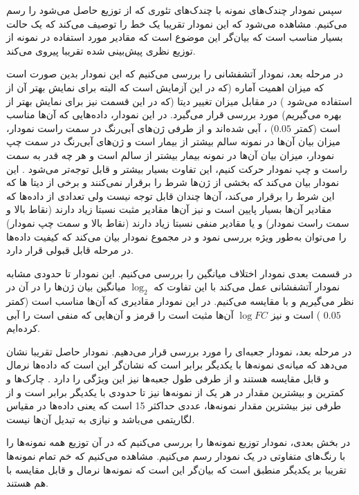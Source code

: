 \documentclass{article}
\begin{document}
سپس نمودار چندک‌های نمونه با چندک‌های تئوری که از توزیع
حاصل می‌شود را رسم می‌کنیم. مشاهده می‌شود که این نمودار تقریبا یک خط را توصیف می‌کند که یک حالت بسیار مناسب است که بیان‌گر این موضوع است که مقادیر مورد استفاده در نمونه از توزیع نظری پیش‌بینی شده تقریبا پیروی می‌کند.


در مرحله بعد، نمودار آتشفشانی
را بررسی می‌کنیم که این نمودار بدین صورت است که میزان اهمیت آماره (که در این آزمایش 
است که البته برای نمایش بهتر آن از 
استفاده می‌شود
)
در مقابل میزان تغییر دیتا (که در این قسمت نیز برای نمایش بهتر 
از 
بهره می‌گیریم)
مورد بررسی قرار می‌گیرد. در این نمودار، داده‌هایی که 
آن‌ها مناسب است (کمتر 
$0.05$)
،
آبی شده‌اند و از طرفی ژن‌های آبی‌رنگ در سمت راست نمودار، میزان بیان آن‌ها در نمونه سالم بیشتر از بیمار است و ژن‌های آبی‌رنگ در سمت چپ نمودار، میزان بیان آن‌ها در نمونه بیمار بیشتر از سالم است و هر چه قدر به سمت راست و چپ نمودار حرکت کنیم، این تفاوت بسیار بیشتر و قابل توجه‌تر می‌شود . 
این نمودار بیان می‌کند که بخشی از ژن‌ها شرط 
را برقرار نمی‌کنند و برخی از دیتا ها که این شرط را برقرار می‌کند، 
آن‌ها چندان قابل توجه نیست  ولی تعدادی از داده‌ها که مقادیر 
آن‌ها بسیار پایین است و نیز 
آن‌ها مقادیر مثبت نسبتا زیاد دارند (نقاط بالا و سمت راست نمودار) و یا مقادیر منفی نسبتا زیاد دارند (نقاط بالا و سمت چپ نمودار) را می‌توان به‌طور ویژه بررسی نمود و در مجموع نمودار بیان می‌کند که کیفیت داده‌ها در مرحله قابل قبولی قرار دارد.

در قسمت بعدی نمودار اختلاف میانگین
را بررسی می‌کنیم. این نمودار تا حدودی مشابه نمودار آتشفشانی عمل می‌کند با این تفاوت که 
$\log_2$
میانگین بیان ژن‌ها را در آن در نظر می‌گیریم و با 
مقایسه می‌کنیم. در این نمودار  مقادیری  که 
آن‌ها مناسب است (کمتر 
$0.05$
)
است و نیز 
$\log FC$
آن‌ها مثبت است را قرمز و آن‌هایی که منفی است را آبی کرده‌ایم.

در مرحله بعد، نمودار جعبه‌ای را مورد بررسی قرار می‌دهیم. نمودار حاصل تقریبا نشان می‌دهد که میانه‌ی نمونه‌ها با یکدیگر برابر است که نشان‌گر این است که داده‌ها نرمال و قابل مقایسه هستند و از طرفی طول جعبه‌ها نیز این ویژگی را دارد . چارک‌ها و کمترین و بیشترین مقدار در هر یک از نمونه‌‌ها نیز تا حدودی با یکدیگر برابر است و از طرفی نیز بیشترین مقدار نمونه‌ها، عددی حداکثر 15 است که یعنی داده‌ها در مقیاس لگاریتمی می‌باشد و نیازی به تبدیل آن‌ها نیست.


در بخش بعدی، نمودار توزیع نمونه‌ها را بررسی می‌کنیم که در آن توزیع همه نمونه‌ها را با رنگ‌های متفاوتی در یک نمودار رسم می‌کنیم. مشاهده می‌کنیم که خم تمام نمونه‌ها تقریبا بر یکدیگر منطبق است که بیان‌گر این است که نمونه‌ها نرمال و قابل مقایسه با هم هستند.
\end{document}
